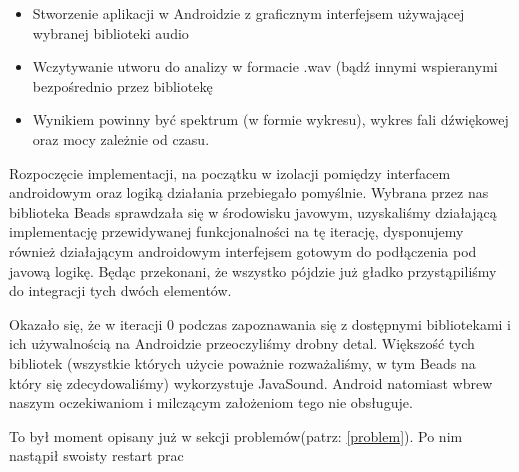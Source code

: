 \begin{Note}


\begin{itemize}
    \item Stworzenie aplikacji w Androidzie z graficznym interfejsem używającej wybranej biblioteki audio
    \item Wczytywanie utworu do analizy w formacie .wav (bądź innymi wspieranymi bezpośrednio przez bibliotekę
    \item Wynikiem powinny być spektrum (w formie wykresu), wykres fali dźwiękowej oraz mocy zależnie od czasu.
\end{itemize}


Rozpoczęcie implementacji, na początku w izolacji pomiędzy interfacem androidowym oraz logiką działania przebiegało pomyślnie. Wybrana przez nas biblioteka Beads sprawdzała się w środowisku javowym, uzyskaliśmy działającą implementację przewidywanej funkcjonalności na tę iterację, dysponujemy również działającym androidowym interfejsem gotowym do podłączenia pod javową logikę. Będąc przekonani, że wszystko pójdzie już gładko przystąpiliśmy do integracji tych dwóch elementów.


Okazało się, że w iteracji 0 podczas zapoznawania się z dostępnymi bibliotekami i ich używalnością na Androidzie przeoczyliśmy drobny detal. Większość tych bibliotek (wszystkie których użycie poważnie rozważaliśmy, w tym Beads na który się zdecydowaliśmy) wykorzystuje JavaSound. Android natomiast wbrew naszym oczekiwaniom i milczącym założeniom tego nie obsługuje.

\end{Note}

To był moment opisany już w sekcji problemów(patrz: \ref{problem}). Po nim nastąpił swoisty restart prac

